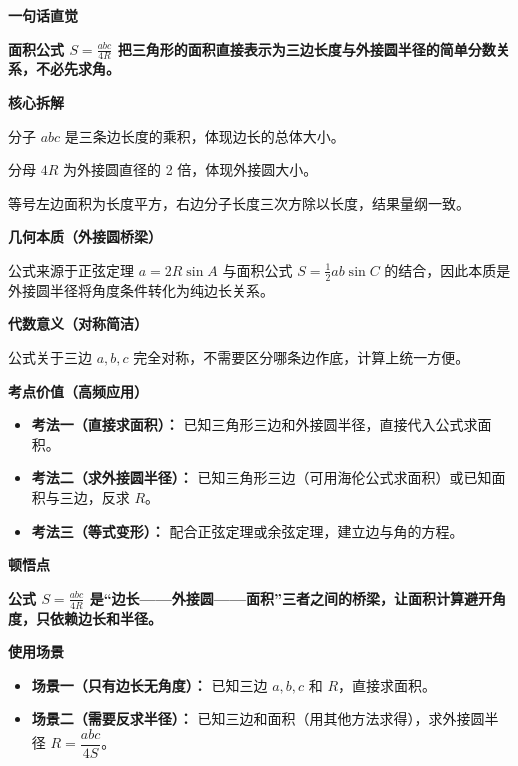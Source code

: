 \begin{explanationbox}
	\textbf{\textcolor{CExplanation}{一句话直觉}}

	\textbf{面积公式 $S=\frac{abc}{4R}$ 把三角形的面积直接表示为三边长度与外接圆半径的简单分数关系，不必先求角。}

	\medskip
	\textbf{\textcolor{CExplanation}{核心拆解}}
	\begin{description}[style=nextline, leftmargin=2.8em, labelsep=0.5em, itemsep=0.45em]
		\item[\textbf{要点一（分子含义）：}] 分子 $abc$ 是三条边长度的乘积，体现边长的总体大小。
		\item[\textbf{要点二（分母含义）：}] 分母 $4R$ 为外接圆直径的 2 倍，体现外接圆大小。
		\item[\textbf{要点三（量纲验证）：}] 等号左边面积为长度平方，右边分子长度三次方除以长度，结果量纲一致。
	\end{description}

	\medskip
	\textbf{\textcolor{CExplanation}{几何本质（外接圆桥梁）}}

	公式来源于正弦定理 $a=2R\sin A$ 与面积公式 $S=\frac12 ab\sin C$ 的结合，因此本质是外接圆半径将角度条件转化为纯边长关系。

	\medskip
	\textbf{\textcolor{CExplanation}{代数意义（对称简洁）}}

	公式关于三边 $a,b,c$ 完全对称，不需要区分哪条边作底，计算上统一方便。

	\medskip
	\textbf{\textcolor{CExplanation}{考点价值（高频应用）}}
	\begin{itemize}[leftmargin=*, itemsep=0.5em, topsep=0.4em]
		\item \textbf{考法一（直接求面积）：} 已知三角形三边和外接圆半径，直接代入公式求面积。
		\item \textbf{考法二（求外接圆半径）：} 已知三角形三边（可用海伦公式求面积）或已知面积与三边，反求 $R$。
		\item \textbf{考法三（等式变形）：} 配合正弦定理或余弦定理，建立边与角的方程。
	\end{itemize}

	\medskip
	\textbf{\textcolor{CExplanation}{顿悟点}}

	\textbf{公式 $S=\frac{abc}{4R}$ 是“边长——外接圆——面积”三者之间的桥梁，让面积计算避开角度，只依赖边长和半径。}

	\medskip
	\textbf{\textcolor{CExplanation}{使用场景}}
	\begin{itemize}[leftmargin=*, itemsep=0.5em, topsep=0.4em]
		\item \textbf{场景一（只有边长无角度）：} 已知三边 $a,b,c$ 和 $R$，直接求面积。
		\item \textbf{场景二（需要反求半径）：} 已知三边和面积（用其他方法求得），求外接圆半径 $R = \dfrac{abc}{4S}$。
	\end{itemize}
\end{explanationbox}
